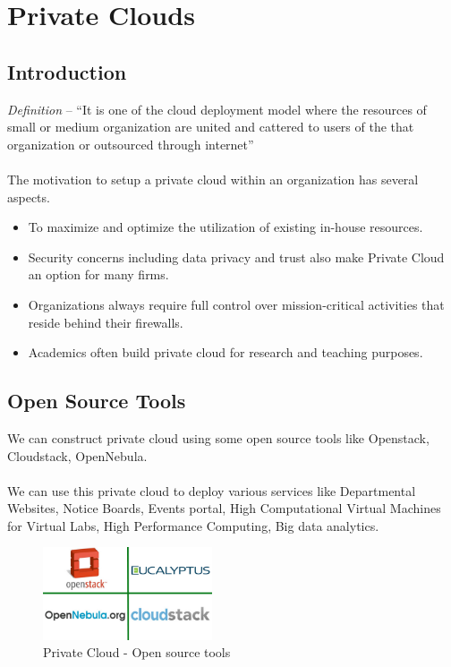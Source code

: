 \documentclass[12pt]{report}
\begin{document}
\newpage
\section{Private Clouds}

\subsection{Introduction}

\textit{Definition} -- ``It is one of the cloud deployment model where the resources of small or medium organization are united and cattered to users of the that organization or outsourced through internet'' \\
\\
The motivation to setup a private cloud within an organization has several aspects. 
\begin{itemize}
\item To maximize and optimize the utilization of existing in-house resources.
\item Security concerns including data privacy and trust also make Private Cloud an option for many firms.
\item Organizations always require full control over mission-critical activities that reside behind their firewalls.
\item Academics often build private cloud for research and teaching purposes.
\end{itemize}

\subsection{Open Source Tools}

We can construct private cloud using some open source tools like Openstack, Cloudstack, OpenNebula. \\
\\
We can use this private cloud to deploy various services like Departmental Websites, Notice Boards, Events portal, High Computational Virtual Machines for Virtual Labs, High Performance Computing, Big data analytics.
\begin{figure}[H]
 \centering
 \includegraphics[width=5cm]{./cloud.jpg}
 \caption{Private Cloud - Open source tools \label{fig:cloud} }
\end{figure}
\end{document}
